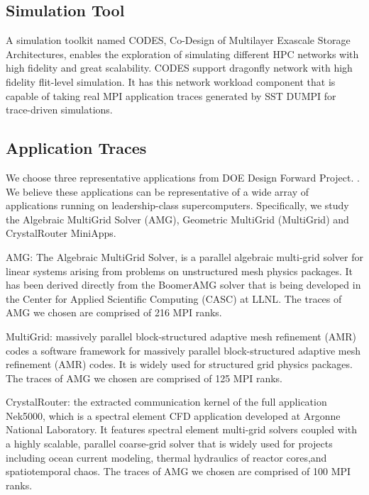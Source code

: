 \documentclass[conference,compsoc]{IEEEtran}
\begin{document}
\subsection{Simulation Tool}
A simulation toolkit named CODES, Co-Design of Multilayer Exascale Storage Architectures, enables the exploration of simulating different HPC networks with high fidelity and great scalability\cite{codes}.  CODES support dragonfly network with high fidelity flit-level simulation\cite{codes-dragonfly}. It has this network workload component that is capable of taking real MPI application traces generated by SST DUMPI\cite{sst} for trace-driven simulations.

\subsection{Application Traces}
\label{sec: application traces}

We choose three representative applications from DOE Design Forward Project\cite{designforwardwebpage}. . We believe these applications can be representative of a wide array of applications running on leadership-class supercomputers. Specifically, we study the Algebraic MultiGrid Solver (AMG), Geometric MultiGrid (MultiGrid) and CrystalRouter MiniApps. 

AMG: The Algebraic MultiGrid Solver, is a parallel algebraic multi-grid solver for linear systems arising from problems on unstructured mesh physics packages. It has been derived directly from the BoomerAMG solver that is being developed in the Center for Applied Scientific Computing (CASC) at LLNL\cite{amg}. The traces of AMG we chosen are comprised of 216 MPI ranks.

MultiGrid: massively parallel block-structured adaptive mesh refinement (AMR) codes a software framework for massively parallel block-structured adaptive mesh refinement (AMR) codes\cite{boxlib}. It is widely used for structured grid physics packages. The traces of AMG we chosen are comprised of 125 MPI ranks.

CrystalRouter: the extracted communication kernel of the full application Nek5000\cite{nek5000}, which is a spectral element CFD application developed at Argonne National Laboratory\cite{crystalrouter}. It features spectral element multi-grid solvers coupled with a highly scalable, parallel coarse-grid solver that is widely used for projects including ocean current modeling, thermal hydraulics of reactor cores,and spatiotemporal chaos. The traces of AMG we chosen are comprised of 100 MPI ranks.
\end{document}
